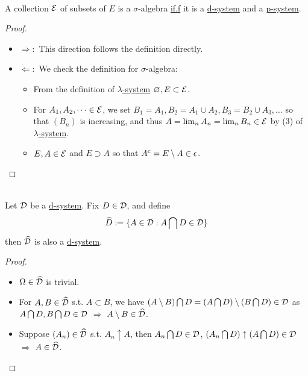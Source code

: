 \vspace{3pt}
\begin{proposition}\label{1.4}\ \\
A collection $\mathcal{E}$ of subsets of $E$ is a $\sigma$-algebra \underline{if.f} it is a \underline{d-system} and a \underline{p-system}.
\end{proposition}
\begin{proof}\ 
\begin{itemize}
    \item $\Rightarrow:$ This direction follows the definition directly.
    \item $\Leftarrow:$ We check the definition for $\sigma$-algebra:
    \begin{itemize}
        \item From the definition of \underline{$\lambda$-system} $\varnothing, E \subset \mathcal{E}$.
        \item For $A_1,A_2,\dots \in \mathcal{E}$, we set $B_1 = A_1, B_2 = A_1 \cup A_2, B_3 = B_2 \cup A_3, \dots$ so that $(B_n)$ is increasing, and thus $A = \lim_n A_n = \lim_n B_n \in \mathcal{E}$ by (3) of \underline{$\lambda$-system}.
        \item $E,A \in \mathcal{E}$ and $E \supset A$ so that $A^c = E \setminus A \in \epsilon$.
    \end{itemize}
\end{itemize}
\end{proof}

\begin{lemma}\label{1.5}\ \\
Let $\mathcal{D}$ be a \underline{d-system}. Fix $D \in \mathcal{D}$, and define
\begin{equation*}
    \widehat{D} := \{A \in \mathcal{D}: A \bigcap D \in \mathcal{D}\}
\end{equation*}
then $\widehat{\mathcal{D}}$ is also a \underline{d-system}.
\end{lemma}
\begin{proof}
\begin{itemize}
    \item $\Omega \in \widehat{\mathcal{D}}$ is trivial.
    \item For $A,B \in \widehat{\mathcal{D}}$ s.t. $A \subset B$, we have $(A \setminus B) \bigcap D = (A \bigcap D) \setminus (B \bigcap D) \in \mathcal{D}$ as $A \bigcap D, B \bigcap D \in \mathcal{D}$ $\Rightarrow$ $A \setminus B \in \widehat{\mathcal{D}}$.
    \item Suppose $(A_n) \in \widehat{\mathcal{D}}$ s.t. $A_n \uparrow A$, then $A_n \bigcap D \in \mathcal{D}$, $(A_n \bigcap D) \uparrow (A \bigcap D) \in \mathcal{D}$ $\Rightarrow$ $A \in \widehat{\mathcal{D}}$.
\end{itemize}
\end{proof}

